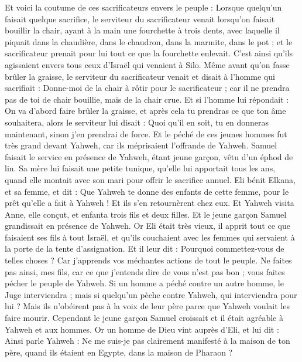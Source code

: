 \begin{multicols}{2}
Et voici la coutume de ces sacrificateurs envers le peuple : Lorsque quelqu'un faisait quelque sacrifice, le serviteur du sacrificateur venait lorsqu'on faisait bouillir la chair, ayant à la main une fourchette à trois dents,
avec laquelle il piquait dans la chaudière, dans le chaudron, dans la marmite, dans le pot ; et le sacrificateur prenait pour lui tout ce que la fourchette enlevait. C'est ainsi qu'ils agissaient envers tous ceux d'Israël qui venaient à Silo.
Même avant qu'on fasse brûler la graisse, le serviteur du sacrificateur venait et disait à l'homme qui sacrifiait : Donne-moi de la chair à rôtir pour le sacrificateur ; car il ne prendra pas de toi de chair bouillie, mais de la chair crue.
Et si l'homme lui répondait : On va d'abord faire brûler la graisse, et après cela tu prendras ce que ton âme souhaitera, alors le serviteur lui disait : Quoi qu'il en soit, tu en donneras maintenant, sinon j'en prendrai de force.
Et le péché de ces jeunes hommes fut très grand devant Yahweh, car ils méprisaient l'offrande de Yahweh.
Samuel faisait le service en présence de Yahweh, étant jeune garçon, vêtu d'un éphod de lin.
Sa mère lui faisait une petite tunique, qu'elle lui apportait tous les ans, quand elle montait avec son mari pour offrir le sacrifice annuel.
Eli bénit Elkana, et sa femme, et dit : Que Yahweh te donne des enfants de cette femme, pour le prêt qu'elle a fait à Yahweh ! Et ils s'en retournèrent chez eux.
Et Yahweh visita Anne, elle conçut, et enfanta trois fils et deux filles. Et le jeune garçon Samuel grandissait en présence de Yahweh.
Or Eli était très vieux, il apprit tout ce que faisaient ses fils à tout Israël, et qu'ils couchaient avec les femmes qui servaient à la porte de la tente d'assignation.
Et il leur dit : Pourquoi commettez-vous de telles choses ? Car j'apprends vos méchantes actions de tout le peuple.
Ne faites pas ainsi, mes fils, car ce que j'entends dire de vous n'est pas bon ; vous faites pécher le peuple de Yahweh.
Si un homme a péché contre un autre homme, le Juge interviendra ; mais si quelqu'un pèche contre Yahweh, qui interviendra pour lui ? Mais ils n'obéirent pas à la voix de leur père parce que Yahweh voulait les faire mourir.
Cependant le jeune garçon Samuel croissait et il était agréable à Yahweh et aux hommes.
Or un homme de Dieu vint auprès d'Eli, et lui dit : Ainsi parle Yahweh : Ne me suis-je pas clairement manifesté à la maison de ton père, quand ils étaient en Egypte, dans la maison de Pharaon ?

\end{multicols}
